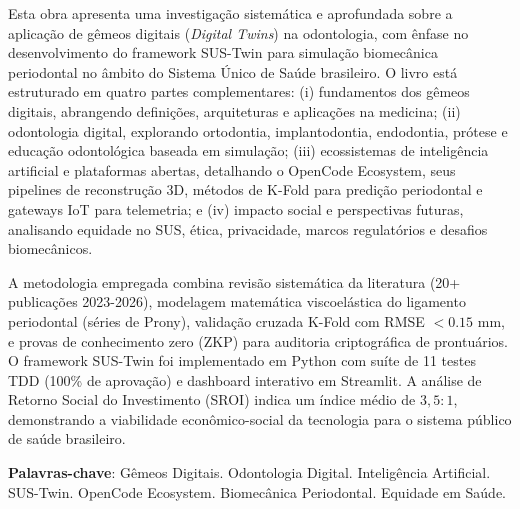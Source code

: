 \newpage
\begin{resumo}[Resumo]
\SingleSpacing

Esta obra apresenta uma investigação sistemática e aprofundada sobre a aplicação de gêmeos digitais (\textit{Digital Twins}) na odontologia, com ênfase no desenvolvimento do framework SUS-Twin para simulação biomecânica periodontal no âmbito do Sistema Único de Saúde brasileiro. O livro está estruturado em quatro partes complementares: (i) fundamentos dos gêmeos digitais, abrangendo definições, arquiteturas e aplicações na medicina; (ii) odontologia digital, explorando ortodontia, implantodontia, endodontia, prótese e educação odontológica baseada em simulação; (iii) ecossistemas de inteligência artificial e plataformas abertas, detalhando o OpenCode Ecosystem, seus pipelines de reconstrução 3D, métodos de K-Fold para predição periodontal e gateways IoT para telemetria; e (iv) impacto social e perspectivas futuras, analisando equidade no SUS, ética, privacidade, marcos regulatórios e desafios biomecânicos.

A metodologia empregada combina revisão sistemática da literatura (20+ publicações 2023-2026), modelagem matemática viscoelástica do ligamento periodontal (séries de Prony), validação cruzada K-Fold com RMSE $< 0.15$ mm, e provas de conhecimento zero (ZKP) para auditoria criptográfica de prontuários. O framework SUS-Twin foi implementado em Python com suíte de 11 testes TDD (100\% de aprovação) e dashboard interativo em Streamlit. A análise de Retorno Social do Investimento (SROI) indica um índice médio de $3,5:1$, demonstrando a viabilidade econômico-social da tecnologia para o sistema público de saúde brasileiro.

\textbf{Palavras-chave}: Gêmeos Digitais. Odontologia Digital. Inteligência Artificial. SUS-Twin. OpenCode Ecosystem. Biomecânica Periodontal. Equidade em Saúde.
\end{resumo}
